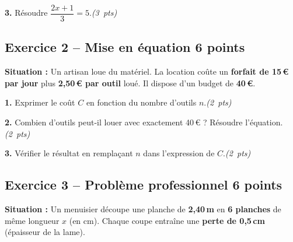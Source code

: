 \documentclass[a4paper,11pt]{article}
\newcommand{\pts}[1]{\hfill\textit{(#1~pts)}}
\newcommand{\reponse}{\par\noindent\dotfill\par}
\newcommand{\reponselong}{%
  \par\noindent\dotfill\par\noindent\dotfill\par}
\begin{document}
\textbf{3.}  Résoudre $\dfrac{2x + 1}{3} = 5$.\pts{3}

\reponselong

\vspace{8pt}

\subsection*{Exercice 2 -- Mise en équation \hfill 6 points}

\begin{tcolorbox}[colback=blue!5, colframe=blue!40, arc=4pt, boxrule=0.6pt,
  left=6pt, right=6pt, top=4pt, bottom=4pt]
\textbf{Situation :} Un artisan loue du matériel. La location coûte un \textbf{forfait de 15\,\euro{} par jour} plus \textbf{2,50\,\euro{} par outil} loué. Il dispose d'un budget de \textbf{40\,\euro{}}.
\end{tcolorbox}

\medskip

\textbf{1.}  Exprimer le coût $C$ en fonction du nombre d'outils $n$.\pts{2}

\reponse

\vspace{4pt}

\textbf{2.}  Combien d'outils peut-il louer avec exactement 40\,\euro{} ? Résoudre l'équation.\pts{2}

\reponselong

\vspace{4pt}

\textbf{3.}  Vérifier le résultat en remplaçant $n$ dans l'expression de $C$.\pts{2}

\reponse

\vspace{8pt}

\subsection*{Exercice 3 -- Problème professionnel \hfill 6 points}

\begin{tcolorbox}[colback=blue!5, colframe=blue!40, arc=4pt, boxrule=0.6pt,
  left=6pt, right=6pt, top=4pt, bottom=4pt]
\textbf{Situation :} Un menuisier découpe une planche de \textbf{2,40\,m} en \textbf{6 planches} de même longueur $x$ (en cm). Chaque coupe entraîne une \textbf{perte de 0,5\,cm} (épaisseur de la lame).
\end{tcolorbox}
\end{document}
